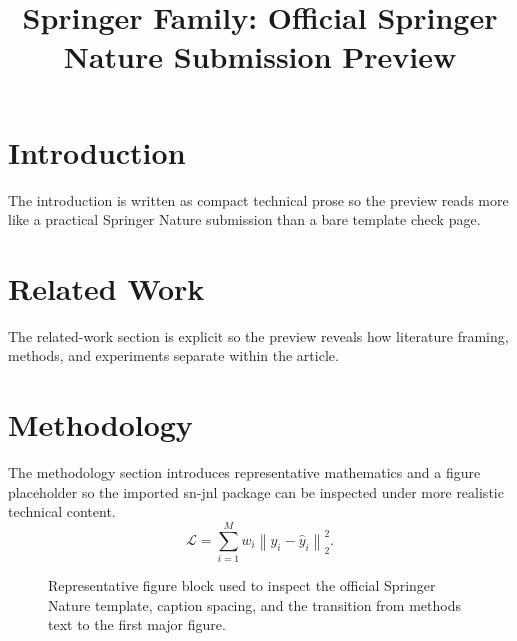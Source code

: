 \documentclass[pdflatex,sn-mathphys-num]{sn-jnl}
\begin{document}
\title[Article Title]{Springer Family: Official Springer Nature Submission Preview}
\author*[1]{ }
\author[2]{ }
\maketitle
\section{Introduction}
The introduction is written as compact technical prose so the preview reads more like a practical Springer Nature submission than a bare template check page.
\section{Related Work}
The related-work section is explicit so the preview reveals how literature framing, methods, and experiments separate within the article.
\section{Methodology}
The methodology section introduces representative mathematics and a figure placeholder so the imported sn-jnl package can be inspected under more realistic technical content.
\begin{equation}
\mathcal{L} = \sum_{i=1}^{M} w_i \left\| y_i - \hat{y}_i \right\|_2^2.
\end{equation}
\begin{figure}[t]
\centering
{}
\caption{Representative figure block used to inspect the official Springer Nature template, caption spacing, and the transition from methods text to the first major figure.}
\end{figure}
\end{document}

